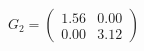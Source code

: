 \documentclass[preview]{standalone}
\begin{document}
\begin{align*}
G_2 = \begin{pmatrix} 1.56 & 0.00 \\ 0.00 & 3.12 \end{pmatrix}
\end{align*}
\end{document}
